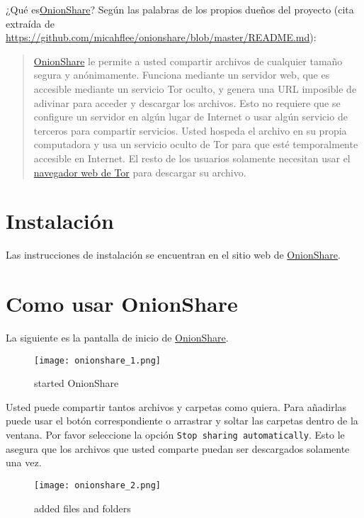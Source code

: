 \documentclass[10pt,a5paper,twoside,,]{book}
\begin{document}
¿Qué es\href{https://onionshare.org/}{OnionShare}? Según las palabras de
los propios dueños del proyecto (cita extraída de
\url{https://github.com/micahflee/onionshare/blob/master/README.md}):

\begin{quote}
\href{https://onionshare.org/}{OnionShare} le permite a usted compartir
archivos de cualquier tamaño segura y anónimamente. Funciona mediante un
servidor web, que es accesible mediante un servicio Tor oculto, y genera
una URL imposible de adivinar para acceder y descargar los archivos.
Esto no requiere que se configure un servidor en algún lugar de Internet
o usar algún servicio de terceros para compartir servicios. Usted
hospeda el archivo en su propia computadora y usa un servicio oculto de
Tor para que esté temporalmente accesible en Internet. El resto de los
usuarios solamente necesitan usar el
\href{https://www.torproject.org/download/download-easy.html.en}{navegador
web de Tor} para descargar su archivo.
\end{quote}

\section{Instalación}\label{instalaciuxf3n-1}

Las instrucciones de instalación se encuentran en el sitio web de
\href{https://onionshare.org/}{OnionShare}.

\section{Como usar OnionShare}\label{como-usar-onionshare}

La siguiente es la pantalla de inicio de
\href{https://onionshare.org}{OnionShare}.

\begin{figure}[htbp]
\centering
\texttt{[image: onionshare\_1.png]}
\caption{started OnionShare}
\end{figure}

Usted puede compartir tantos archivos y carpetas como quiera. Para
añadirlas puede usar el botón correspondiente o arrastrar y soltar las
carpetas dentro de la ventana. Por favor seleccione la opción
\texttt{Stop\ sharing\ automatically}. Esto le asegura que los archivos
que usted comparte puedan ser descargados solamente una vez.

\begin{figure}[htbp]
\centering
\texttt{[image: onionshare\_2.png]}
\caption{added files and folders}
\end{figure}
\end{document}
